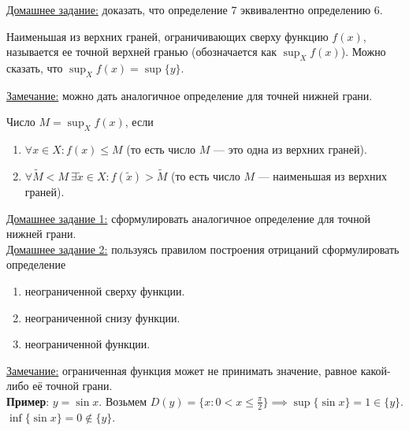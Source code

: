 \documentclass{article}
\begin{document}
    \noindent
    \underline{Домашнее задание:} доказать, что определение 7 эквивалентно определению 6.
    \begin{definition}
        Наименьшая из верхних граней, ограничивающих сверху функцию \(f(x)\), называется ее точной верхней гранью (обозначается как \(\displaystyle \sup_{X}{f(x)}\)).
        Можно сказать, что \(\displaystyle \sup_{X}{f(x)} = \sup{\{y\}}\). 
    \end{definition}
    \noindent
    \underline{Замечание:} можно дать аналогичное определение для точней нижней грани.
    \begin{claim}
        Число \(M = \sup_{X}{f(x)}\), если
        \begin{enumerate}
            \item \(\forall x \in X: f(x) \leq M\) (то есть число \(M\) --- это одна из верхних граней).
            \item \(\forall \widetilde{M} < M\ \exists \widetilde{x} \in X: f(\widetilde{x}) > \widetilde{M}\) (то есть число \(M\) --- наименьшая из верхних граней).  
        \end{enumerate}  
    \end{claim}
    \noindent
    \underline{Домашнее задание 1:} сформулировать аналогичное определение для точной нижней грани.\\
    \underline{Домашнее задание 2:} пользуясь правилом построения отрицаний сформулировать определение
    \begin{enumerate}
        \item неограниченной сверху функции.
        \item неограниченной снизу функции.
        \item неограниченной функции.
    \end{enumerate}
    \underline{Замечание:} ограниченная функция может не принимать значение, равное какой-либо её точной грани.\\
    \textbf{Пример}: \(y = \sin{x}\). Возьмем \(D(y) = \{x : 0 < x \leq \frac{\pi}{2}\} \implies \sup\{\sin{x}\} = 1 \in \{y\}\). \(\inf\{\sin{x}\} = 0 \notin \{y\}\). 
\end{document}
